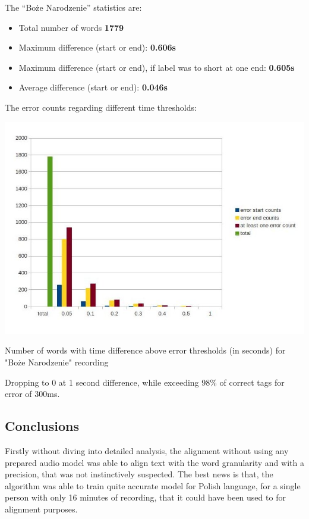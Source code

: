 \documentclass[12pt,a4paper,english]{article}
\begin{document}
\newpage
The “Boże Narodzenie” statistics are: \newline
\begin{itemize}
    \item Total number of words				\textbf{1779}
    \item Maximum difference (start or end): 			\textbf{0.606s}
    \item Maximum difference (start or end), if label was to short at one end: 			\textbf{0.605s}
    \item Average difference  (start or end):			\textbf{0.046s}
\end{itemize}
The error counts regarding different time thresholds:
\begin{center}
    \includegraphics[scale=0.6]{boze_narodzenie_length_based_counts.jpg}
    \caption[]{Number of words with time difference above error thresholds (in seconds) for "Boże Narodzenie" recording}
\end{center}
Dropping to 0 at 1 second difference, while exceeding 98\% of correct tags for error of 300ms.

\newpage
\subsection{Conclusions}

Firstly without diving into detailed analysis, the alignment without using any prepared audio model was able to align text with the word granularity and with a precision, that was not instinctively suspected. \newline
The best news is that, the algorithm was able to train quite accurate model for Polish language, for a single person with only 16 minutes of recording, that it could have been used to for alignment purposes. \newline
\end{document}
